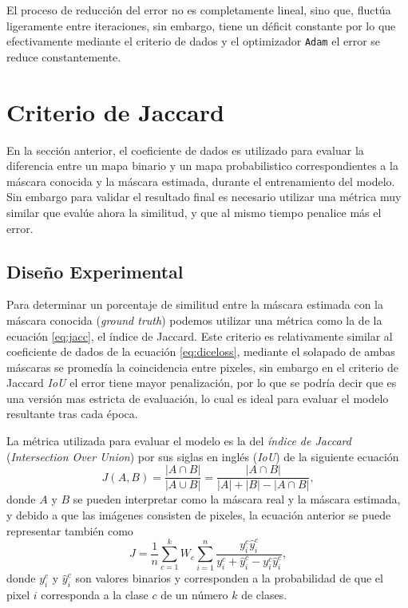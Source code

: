 El proceso de reducción del error no es completamente lineal, sino que, fluctúa ligeramente entre iteraciones, sin embargo, tiene un déficit constante por lo que efectivamente mediante el criterio de dados y el optimizador \texttt{Adam} el error se reduce constantemente.



\clearpage

\section{Criterio de Jaccard}
En la sección anterior, el coeficiente de dados es utilizado para evaluar la diferencia entre un mapa binario y un mapa probabilistico correspondientes a la máscara conocida y la máscara estimada, durante el entrenamiento del modelo. Sin embargo para validar el resultado final es necesario utilizar una métrica muy similar que evalúe ahora la similitud, y que al mismo tiempo penalice más el error.

\subsection{Diseño Experimental}
Para determinar un porcentaje de similitud entre la máscara estimada con la máscara conocida (\emph{ground truth}) podemos utilizar una métrica como la de la ecuación \ref{eq:jacc}, el índice de Jaccard. Este criterio es relativamente similar al coeficiente de dados de la ecuación \ref{eq:diceloss}, mediante el solapado de ambas máscaras se promedía la coincidencia entre pixeles, sin embargo en el criterio de Jaccard \emph{IoU} el error tiene mayor penalización, por lo que se podría decir que es una versión mas estricta de evaluación, lo cual es ideal para evaluar el modelo resultante tras cada época.

La métrica utilizada para evaluar el modelo es la del \emph{índice de Jaccard} (\emph{Intersection Over Union}) por sus siglas en inglés (\emph{IoU}) \citep{fpn_1} de la siguiente ecuación
\begin{equation}\label{eq:jacc}
    J(A,B) = \frac{|A \cap B|}{| A \cup B |} = \frac{|A \cap B|}{|A| + |B| - |A \cap B|} \text{,}
\end{equation} 
donde $A$ y $B$ se pueden interpretar como la máscara real y la máscara estimada, y debido a que las imágenes consisten de pixeles, la ecuación anterior se puede representar también como
\begin{equation}
    J = \frac{1}{n} \sum_{c=1}^{k} W_c \sum_{i=1}^{n}\frac{y_i^c \hat y_i^c}{y_i^c + \hat y_i^c - y_i^c \hat y_i^c} \text{,}
\end{equation} 
donde $y_i^c$ y $\hat y_i^c$ son valores binarios y corresponden a la probabilidad de que el pixel $i$ corresponda a la clase $c$ de un número $k$ de clases.

